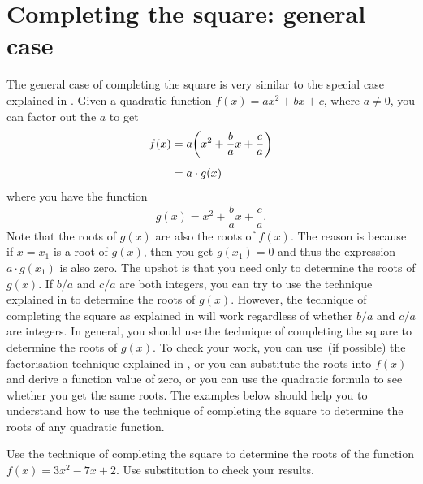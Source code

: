 \documentclass[a4paper,oneside,12pt]{article}
\begin{document}

\section{Completing the square: general case}

The general case of completing the square is very similar to the
special case explained
in .  Given a
quadratic function $f(x) = ax^2 + bx + c$, where $a \neq 0$, you can
factor out the $a$ to get
\begin{align*}
f(x)
&=
a
\parenthesis*{
  x^2 + \frac{b}{a}x + \frac{c}{a}
} \\[4pt]
&=
a \cdot g(x)
\end{align*}
where you have the function
\[
g(x)
=
x^2 + \frac{b}{a}x + \frac{c}{a}.
\]
Note that the roots of $g(x)$ are also the roots of $f(x)$.  The
reason is because if $x = x_1$ is a root of $g(x)$, then you get
$g(x_1) = 0$ and thus the expression $a \cdot g(x_1)$ is also zero.
The upshot is that you need only to determine the roots of $g(x)$.  If
$b / a$ and $c / a$ are both integers, you can try to use the
technique explained in  to determine
the roots of $g(x)$.  However, the technique of completing the square
as explained in  will
work regardless of whether $b / a$ and $c / a$ are integers.  In
general, you should use the technique of completing the square to
determine the roots of $g(x)$.  To check your work, you can use~(if
possible) the factorisation technique explained
in , or you can substitute the roots
into $f(x)$ and derive a function value of zero, or you can use the
quadratic formula to see whether you get the same roots.  The examples
below should help you to understand how to use the technique of
completing the square to determine the roots of any quadratic
function.

\begin{example}
\label{eg:completing_square_a3_bminus7_c2}
Use the technique of completing the square to determine the roots of
the function $f(x) = 3x^2 - 7x + 2$.  Use substitution to check your
results.
\end{example}
\end{document}
